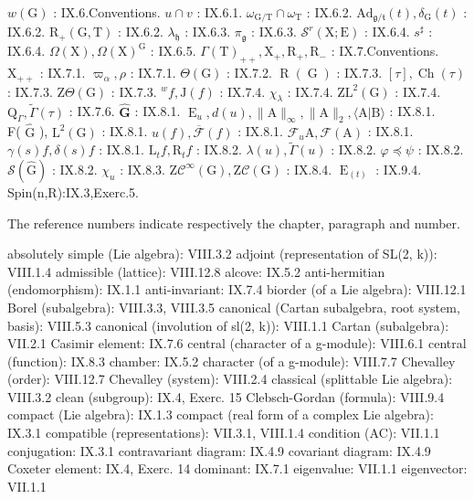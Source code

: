\(w(\mathrm{G})\) : IX.6.Conventions. \(u\cap v\) : IX.6.1. \(\omega_{\mathrm{G / T}}\cap \omega_{\mathrm{T}}\) : IX.6.2. \(\mathrm{Ad}_{\mathfrak{g} / \mathfrak{t}}(t),\delta_{\mathrm{G}}(t)\) : IX.6.2. \(\mathrm{R}_+(\mathrm{G},\mathrm{T})\) : IX.6.2. \(\lambda_{\mathfrak{h}}\) : IX.6.3. \(\pi_{\mathfrak{g}}\) : IX.6.3. \(\mathcal{S}^r (\mathrm{X};\mathrm{E})\) : IX.6.4. \(s^\sharp\) : IX.6.4. \(\Omega (\mathrm{X}),\Omega (\mathrm{X})^{\mathrm{G}}\) : IX.6.5. \(\Gamma (\mathrm{T})_{++},\mathrm{X}_{+},\mathrm{R}_{+},\mathrm{R}_{-}\) : IX.7.Conventions. \(\mathrm{X}_{++}\) : IX.7.1. \(\varpi_{\alpha},\rho\) : IX.7.1. \(\Theta (\mathrm{G})\) : IX.7.2. \(\operatorname {R}(\operatorname {G})\) : IX.7.3. \([\tau ],\operatorname {Ch}(\tau)\) : IX.7.3. \(\mathrm{Z}\Theta (\mathrm{G})\) : IX.7.3. \(^w f,\mathrm{J}(f)\) : IX.7.4. \(\chi_{\lambda}\) : IX.7.4. \(\mathrm{ZL}^2 (\mathrm{G})\) : IX.7.4. \(\mathrm{Q}_{\Gamma},\tilde{\Gamma} (\tau)\) : IX.7.6. \(\hat{\mathbf{G}}\) : IX.8.1. \(\operatorname {E}_u,d(u),\| \mathrm{A}\|_\infty ,\| \mathrm{A}\| _2,\langle \mathrm{A}|\mathrm{B}\rangle\) : IX.8.1.\\
F( \(\hat{\mathrm{G}}\) ), \(\mathrm{L}^2 (\mathrm{G})\) : IX.8.1. \(u(f),\overline{\mathcal{F}} (f)\) : IX.8.1. \(\mathcal{F}_u\mathrm{A},\mathcal{F}(\mathrm{A})\) : IX.8.1. \(\gamma (s)f,\delta (s)f\) : IX.8.1. \(\mathrm{L}_t f,\mathrm{R}_t f\) : IX.8.2. \(\lambda (u),\tilde{\Gamma} (u)\) : IX.8.2. \(\varphi \preccurlyeq \psi\) : IX.8.2. \(\mathcal{S}(\hat{\mathrm{G}})\) : IX.8.2. \(\chi_u\) : IX.8.3. \(\mathrm{Z}\mathcal{C}^{\infty}(\mathrm{G}),\mathrm{Z}\mathcal{C}(\mathrm{G})\) : IX.8.4. \(\operatorname {E}_{(t)}\) : IX.9.4.\\
Spin(n,R):IX.3,Exerc.5.


The reference numbers indicate respectively the chapter, paragraph and number.

absolutely simple (Lie algebra): VIII.3.2 adjoint (representation of SL(2, k)): VIII.1.4 admissible (lattice): VIII.12.8 alcove: IX.5.2 anti-hermitian (endomorphism): IX.1.1 anti-invariant: IX.7.4 biorder (of a Lie algebra): VIII.12.1 Borel (subalgebra): VIII.3.3, VIII.3.5 canonical (Cartan subalgebra, root system, basis): VIII.5.3 canonical (involution of sl(2, k)): VIII.1.1 Cartan (subalgebra): VII.2.1 Casimir element: IX.7.6 central (character of a g-module): VIII.6.1 central (function): IX.8.3 chamber: IX.5.2 character (of a g-module): VIII.7.7 Chevalley (order): VIII.12.7 Chevalley (system): VIII.2.4 classical (splittable Lie algebra): VIII.3.2 clean (subgroup): IX.4, Exerc. 15 Clebsch-Gordan (formula): VIII.9.4 compact (Lie algebra): IX.1.3 compact (real form of a complex Lie algebra): IX.3.1 compatible (representations): VII.3.1, VIII.1.4 condition (AC): VII.1.1 conjugation: IX.3.1 contravariant diagram: IX.4.9 covariant diagram: IX.4.9 Coxeter element: IX.4, Exerc. 14 dominant: IX.7.1 eigenvalue: VII.1.1 eigenvector: VII.1.1

